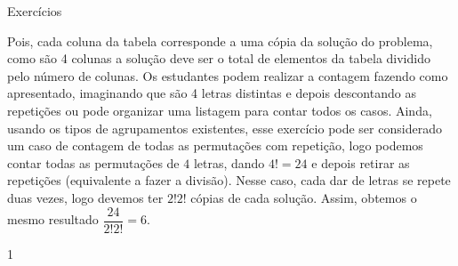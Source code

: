 \begin{answer}{Exercícios}
{\begin{enumerate}
Pois, cada coluna da tabela corresponde a uma cópia da solução do problema, como são 4 colunas  a solução deve ser o total de elementos da tabela dividido pelo número de colunas.
Os estudantes podem realizar a contagem fazendo como apresentado, imaginando que são 4 letras distintas e depois descontando as repetições ou pode organizar uma listagem para contar todos os casos. 
Ainda, usando os tipos de agrupamentos existentes, esse exercício pode ser considerado um caso de contagem de todas as  permutações com repetição, logo podemos contar todas as permutações de $4$ letras, dando $4!=24$ e depois retirar as repetições (equivalente a fazer a divisão). Nesse caso, cada dar de letras se repete duas vezes, logo devemos ter $2!2!$ cópias de cada solução. Assim, obtemos o mesmo resultado $\dfrac{24}{2!2!} =6. $
\end{enumerate}
}{1}
\end{answer}
